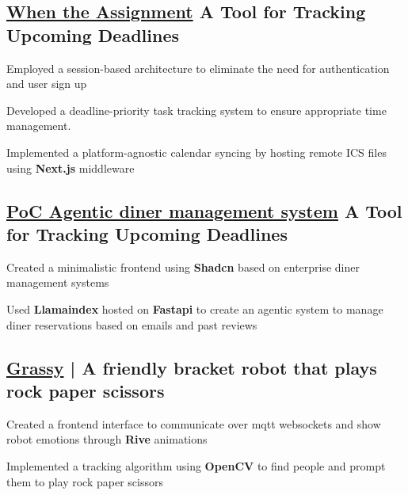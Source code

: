 \subsection{\href{https://mcwta.vercel.app/}{When the Assignment} \textbar{} A Tool for Tracking Upcoming Deadlines}
\begin{zitemize}
    \item Employed a session-based architecture to eliminate the need for authentication and user sign up
    \item Developed a deadline-priority task tracking system to ensure appropriate time management.
    \item Implemented a platform-agnostic calendar syncing by hosting remote ICS files using \textbf{Next.js} middleware
\end{zitemize}

\vspace{0.3cm}
\subsection{\href{https://agentic-dining.vercel.app/}{PoC Agentic diner management system} \textbar{} A Tool for Tracking Upcoming Deadlines}
\begin{zitemize}
    \item Created a minimalistic frontend using \textbf{Shadcn} based on enterprise diner management systems
    \item Used \textbf{Llamaindex} hosted on \textbf{Fastapi} to create an agentic system to manage diner reservations based on emails and past reviews
\end{zitemize}


\vspace{0.3cm}\subsection{\href{https://github.com/arian81/bracket-bot-controller}{Grassy} | A friendly bracket robot that plays rock paper scissors }
\begin{zitemize}
    \item Created a frontend interface to communicate over mqtt websockets and show robot emotions through \textbf{Rive} animations
    \item Implemented a tracking algorithm using \textbf{OpenCV} to find people and prompt them to play rock paper scissors
\end{zitemize}



